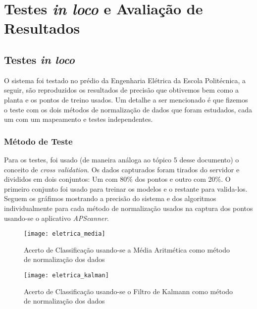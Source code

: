\chapter{Testes \textit{in loco} e Avaliação de Resultados}

\section{Testes \textit{in loco}}

O sistema foi testado no prédio da Engenharia Elétrica da Escola Politécnica, a seguir, são reproduzidos os resultados de precisão que obtivemos bem como a planta e os pontos de treino usados. Um detalhe a ser mencionado é que fizemos o teste com os dois métodos de normalização de dados que foram estudados, cada um com um mapeamento e testes independentes.



\subsection{Método de Teste}

Para os testes, foi usado (de maneira análoga ao tópico 5 desse documento) o conceito de \textit{cross validation}. Os dados capturados foram tirados do servidor e divididos em dois conjuntos: Um com 80\% dos pontos e outro com 20\%. O primeiro conjunto foi usado para treinar os modelos e o restante para valida-los. Seguem os gráfimos mostrando a precisão do sistema e dos algoritmos individualmente para cada método de normalização usados na captura dos pontos usando-se o aplicativo \textit{APScanner}.

\begin{figure}[H]
\centering
\caption{Acerto de Classificação usando-se a Média Aritmética como método de normalização dos dados}
 \texttt{[image: eletrica\_media]}

\end{figure}


\begin{figure}[H]
\centering
\caption{Acerto de Classificação usando-se o Filtro de Kalmann como método de normalização dos dados}
 \texttt{[image: eletrica\_kalman]}

\end{figure}


